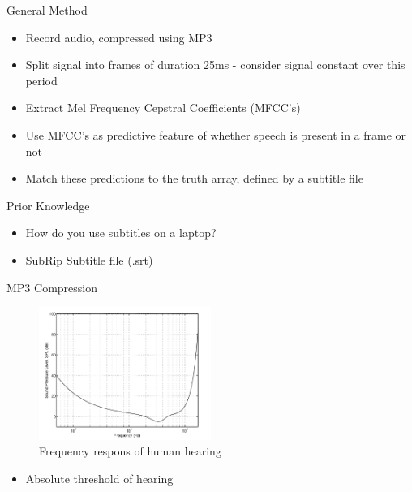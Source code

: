 \documentclass[notes]{beamer}
\begin{document}


\begin{frame}{General Method}
\begin{itemize}
	\item Record audio, compressed using MP3
	\item Split signal into frames of duration 25ms - consider signal constant over this period
	\item Extract Mel Frequency Cepstral Coefficients (MFCC's)
	\item Use MFCC's as predictive feature of whether speech is present in a frame or not
	\item Match these predictions to the truth array, defined by a subtitle file
\end{itemize}
\end{frame}


\begin{frame}{Prior Knowledge}
\begin{itemize}
  \item How do you use subtitles on a laptop?
  \item SubRip Subtitle file (.srt)
\end{itemize}
\end{frame}


\begin{frame}{MP3 Compression}
\begin{figure}
	\centering
	\includegraphics[width=0.5\textwidth]{"figures/Frequency Response from Perceptual Coding of Digital Audio NOCAPTION"}
	\caption{Frequency respons of human hearing}
\end{figure}
\begin{itemize}
	\item Absolute threshold of hearing
	
\end{itemize}
\end{frame}
\end{document}
